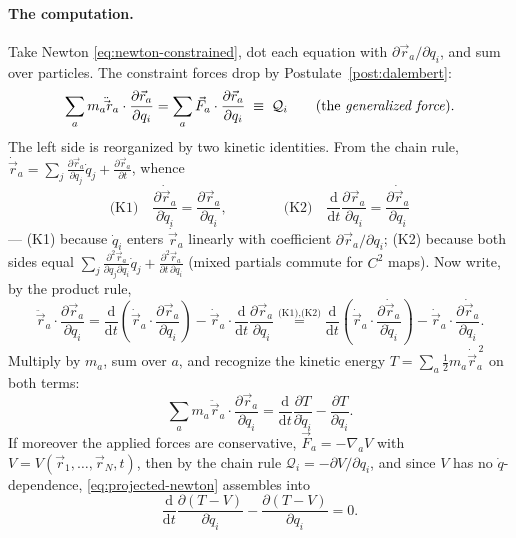 \documentclass[11pt]{article}
\theoremstyle{plain}
\theoremstyle{definition}
\theoremstyle{remark}
\newcommand{\dd}{\mathrm{d}}
\newcommand{\pd}[2]{\frac{\partial #1}{\partial #2}}
\newcommand{\vr}{\vec{r}}
\begin{document}
\paragraph{The computation.}
Take Newton \eqref{eq:newton-constrained}, dot each equation with
$\partial\vr_a/\partial q_i$, and sum over particles. The constraint
forces drop by Postulate~\ref{post:dalembert}:
\begin{equation}
  \sum_a m_a \ddot\vr_a\cdot\pd{\vr_a}{q_i}
  = \sum_a \vec F_a \cdot \pd{\vr_a}{q_i}
  \;\equiv\; \mathcal{Q}_i
  \qquad(\text{the \emph{generalized force}}).
  \label{eq:projected-newton}
\end{equation}
The left side is reorganized by two kinetic identities. From the chain
rule, $\dot\vr_a = \sum_j \pd{\vr_a}{q_j}\dot q_j + \pd{\vr_a}{t}$, whence
\begin{equation}
  \text{(K1)}\quad \pd{\dot\vr_a}{\dot q_i} = \pd{\vr_a}{q_i},
  \qquad\qquad
  \text{(K2)}\quad \frac{\dd}{\dd t}\pd{\vr_a}{q_i} = \pd{\dot\vr_a}{q_i}
\end{equation}
--- (K1) because $\dot q_i$ enters $\dot\vr_a$ linearly with coefficient
$\partial\vr_a/\partial q_i$; (K2) because both sides equal
$\sum_j \tfrac{\partial^2\vr_a}{\partial q_j\partial q_i}\dot q_j
+ \tfrac{\partial^2 \vr_a}{\partial t\,\partial q_i}$ (mixed partials
commute for $C^2$ maps). Now write, by the product rule,
\begin{equation}
  \ddot\vr_a \cdot \pd{\vr_a}{q_i}
  = \frac{\dd}{\dd t}\!\left(\dot\vr_a\cdot\pd{\vr_a}{q_i}\right)
  - \dot\vr_a\cdot\frac{\dd}{\dd t}\pd{\vr_a}{q_i}
  \overset{\text{(K1),(K2)}}{=}
  \frac{\dd}{\dd t}\!\left(\dot\vr_a\cdot\pd{\dot\vr_a}{\dot q_i}\right)
  - \dot\vr_a\cdot\pd{\dot\vr_a}{q_i} .
\end{equation}
Multiply by $m_a$, sum over $a$, and recognize the kinetic energy
$T = \sum_a \tfrac12 m_a \dot\vr_a^{\,2}$ on both terms:
\begin{equation}
  \sum_a m_a\ddot\vr_a\cdot\pd{\vr_a}{q_i}
  = \frac{\dd}{\dd t}\pd{T}{\dot q_i} - \pd{T}{q_i}.
\end{equation}
If moreover the applied forces are conservative, $\vec F_a = -\nabla_a V$
with $V = V(\vr_1,\dots,\vr_N,t)$, then by the chain rule
$\mathcal{Q}_i = -\partial V/\partial q_i$, and since $V$ has no
$\dot q$-dependence, \eqref{eq:projected-newton} assembles into
\begin{equation}
  \frac{\dd}{\dd t}\pd{(T-V)}{\dot q_i} - \pd{(T-V)}{q_i} = 0 .
\end{equation}
\end{document}
